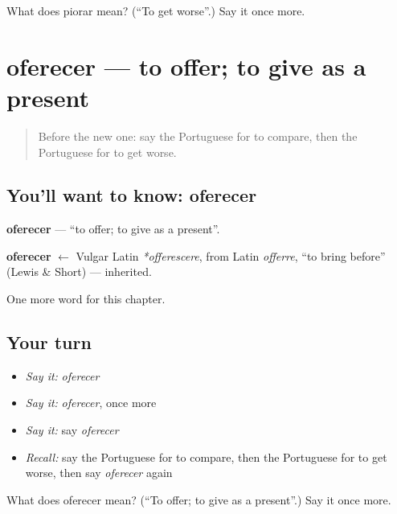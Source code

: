 \begin{tcolorbox}[breakable,colback=teal!4,colframe=teal!35!black,title={Before you move on}]
What does piorar mean? (\textquotedblleft{}To get worse\textquotedblright{}.) Say it once more.
\end{tcolorbox}
\section[oferecer]{oferecer — to offer; to give as a present}

\label{lesson:PT-C205-oferecer}



\begin{quote}
Before the new one: say the Portuguese for to compare, then the Portuguese for to get worse.
\end{quote}

\subsection*{You'll want to know: oferecer}
\textbf{oferecer} — \textquotedblleft{}to offer; to give as a present\textquotedblright{}.

\begin{cousinweb}
\textbf{oferecer} $\leftarrow$ Vulgar Latin \emph{*offerescere}, from Latin \emph{offerre}, \textquotedblleft{}to bring before\textquotedblright{} (Lewis \& Short) — inherited.
\end{cousinweb}

\begin{grammarlens}[title={What you've built}]
One more word for this chapter.
\end{grammarlens}

\subsection*{Your turn}
\begin{itemize}
\raggedright
  \item \emph{Say it:} \emph{oferecer}
  \item \emph{Say it:} \emph{oferecer}, once more
  \item \emph{Say it:} say \emph{oferecer}
  \item \emph{Recall:} say the Portuguese for to compare, then the Portuguese for to get worse, then say \emph{oferecer} again
\end{itemize}

\begin{tcolorbox}[breakable,colback=teal!4,colframe=teal!35!black,title={Before you move on}]
What does oferecer mean? (\textquotedblleft{}To offer; to give as a present\textquotedblright{}.) Say it once more.
\end{tcolorbox}
